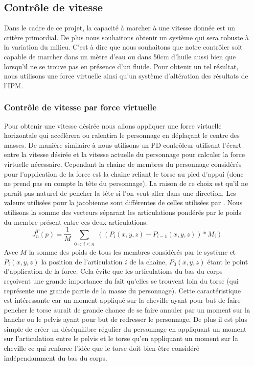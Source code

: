 \documentclass[runningheads,a4paper]{llncs}
\begin{document}
%
\subsection{Contrôle de vitesse}
%
\label{sec:speed_control}
Dans le cadre de ce projet, la capacité à marcher à une vitesse donnée est un critère primordial. De plus nous souhaitons obtenir un système qui sera robuste à la variation du milieu. C'est à dire que nous souhaitons que notre contrôler soit capable de marcher dans un mètre d'eau ou dans 50cm d'huile aussi bien que lorsqu'il ne se trouve pas en présence d'un fluide. Pour obtenir un tel résultat, nous utilisons une force virtuelle ainsi qu'un système d'altération des résultats de l'IPM.
%
\subsubsection{Contrôle de vitesse par force virtuelle}
%
\label{sec:speed_virt_force}

Pour obtenir une vitesse désirée nous allons appliquer une force virtuelle horizontale qui accélèrera ou ralentira le personnage en déplaçant le centre des masses. De manière similaire à \cite{coros2010generalized} nous utilisons un PD-contrôleur utilisant l'écart entre la vitesse désirée et la vitesse actuelle du personnage pour calculer la force virtuelle nécessaire.
Cependant la chaine de membres du personnage considérés pour l'application de la force est la chaine reliant le torse au pied d'appui (donc ne prend pas en compte la tête du personnage). La raison de ce choix est qu'il ne parait pas naturel de pencher la tête si l'on veut aller dans une direction. Les valeurs utilisées pour la jacobienne sont différentes de celles utilisées par \cite{coros2010generalized}. Nous utilisons la somme des vecteurs séparant les articulations pondérés par le poids du membre présent entre ces deux articulations.
\[
J_n ^T (p)=\frac{1}{M}\sum_{\substack{0<i\leq n}} ((P_i(x,y,z)-P_{i-1}(x,y,z))*M_i)
\]
Avec \(M\) la somme des poids de tous les membres considérés par le système et \(P_i(x,y,z)\) la position de l'articulation \(i\) de la chaine, \(P_0(x,y,z)\) étant le point d'application de la force. Cela évite que les articulations du bas du corps reçoivent une grande importance du fait qu'elles se trouvent loin du torse (qui représente une grande partie de la masse du personnage). Cette caractéristique est intéressante car un moment appliqué sur la cheville ayant pour but de faire pencher le torse aurait de grande chance de se faire annuler par un moment sur la hanche ou le pelvis ayant pour but de redresser le personnage. De plus il est plus simple de créer un déséquilibre régulier du personnage en appliquant un moment sur l'articulation entre le pelvis et le torse qu'en appliquant un moment sur la cheville ce qui renforce l'idée que le torse doit bien être considéré indépendamment du bas du corps.
\end{document}
